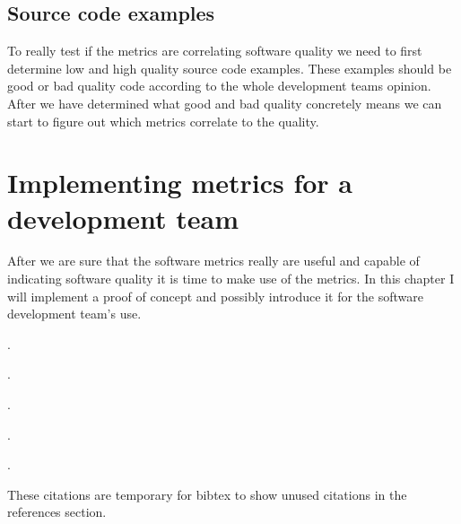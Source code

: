 \section{Source code examples}
To really test if the metrics are correlating software quality we need to first determine low and high quality source code examples. These examples should be good or bad quality code according to the whole development teams opinion. After we have determined what good and bad quality concretely means we can start to figure out which metrics correlate to the quality. 

\chapter{Implementing metrics for a development team}

After we are sure that the software metrics really are useful and capable of indicating software quality it is time to make use of the metrics. In this chapter I will implement a proof of concept and possibly introduce it for the software development team's use.

.

.

.

.

.

These citations are temporary for bibtex to show unused citations in the references section.

\cite{tikka2014}

\cite{coleman1994using}

\cite{viljanen2015measuring}

\cite{zhuo1993constructing}

\cite{al2005analysis}

\cite{jamali2006object}

\cite{sarker2005overview}






